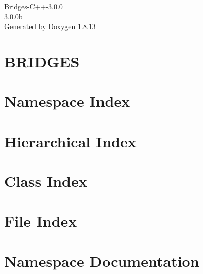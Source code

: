 \documentclass[twoside]{book}
\newcommand{\+}{\discretionary{\mbox{\scriptsize$\hookleftarrow$}}{}{}}
\newcommand{\clearemptydoublepage}{%
  \newpage{\pagestyle{empty}\cleardoublepage}%
}
\begin{document}
\hypersetup{pageanchor=false,
             bookmarksnumbered=true,
             pdfencoding=unicode
            }
\begin{titlepage}
\vspace*{7cm}
\begin{center}%
{\Large Bridges-\/\+C++-\/3.0.0 \\[1ex]\large 3.\+0.\+0b }\\
\vspace*{1cm}
{\large Generated by Doxygen 1.8.13}\\
\end{center}
\end{titlepage}
\clearemptydoublepage
{}
\tableofcontents
\clearemptydoublepage
{}
\hypersetup{pageanchor=true}

\chapter{B\+R\+I\+D\+G\+ES}
\label{index}\hypertarget{index}{}
\chapter{Namespace Index}

\chapter{Hierarchical Index}

\chapter{Class Index}

\chapter{File Index}

\chapter{Namespace Documentation}







\end{document}
